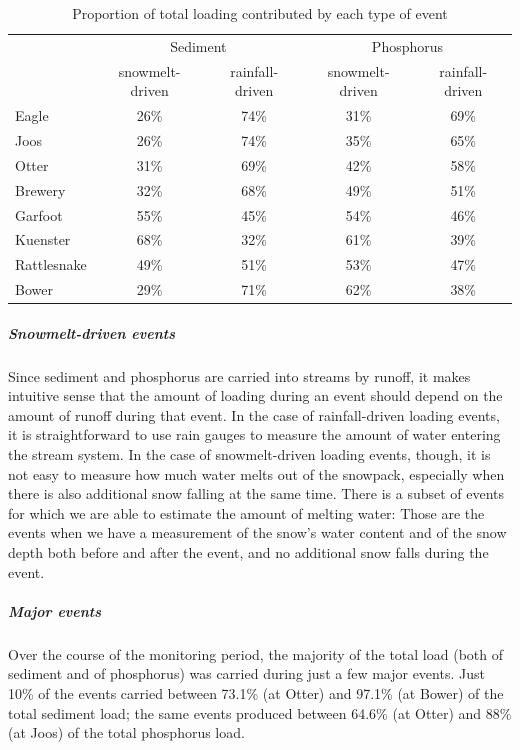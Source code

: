 \documentclass[10pt]{article}
\begin{document}
\begin{table}[ht]
\begin{center}
\begin{tabular}{lcccc}
   & \multicolumn{2}{c}{Sediment} & \multicolumn{2}{c}{Phosphorus} \\
 & snowmelt-driven & rainfall-driven & snowmelt-driven & rainfall-driven \\ 
  \hline
Eagle & 26\% & 74\% & 31\% & 69\% \\ 
  Joos & 26\% & 74\% & 35\% & 65\% \\ 
  Otter & 31\% & 69\% & 42\% & 58\% \\ 
  Brewery & 32\% & 68\% & 49\% & 51\% \\ 
  Garfoot & 55\% & 45\% & 54\% & 46\% \\ 
  Kuenster & 68\% & 32\% & 61\% & 39\% \\ 
  Rattlesnake & 49\% & 51\% & 53\% & 47\% \\ 
  Bower & 29\% & 71\% & 62\% & 38\% \\ 
  \end{tabular}
\caption{Proportion of total loading contributed by each type of event}
\label{ab:rainorsnow}
\end{center}
\end{table}
\subparagraph{Snowmelt-driven events}
Since sediment and phosphorus are carried into streams by runoff, it makes intuitive sense that the amount of loading during an event should depend on the amount of runoff during that event. In the case of rainfall-driven loading events, it is straightforward to use rain gauges to measure the amount of water entering the stream system. In the case of snowmelt-driven loading events, though, it is not easy to measure how much water melts out of the snowpack, especially when there is also additional snow falling at the same time. There is a subset of events for which we are able to estimate the amount of melting water: Those are the events when we have a measurement of the snow's water content and of the snow depth both before and after the event, and no additional snow falls during the event.\\

\subparagraph{Major events}
Over the course of the monitoring period, the majority of the total load (both of sediment and of phosphorus) was carried during just a few major events. Just 10\% of the events carried between 73.1\% (at Otter) and 97.1\% (at Bower) of the total sediment load; the same events produced between 64.6\% (at Otter) and 88\% (at Joos) of the total phosphorus load.\\
\end{document}
